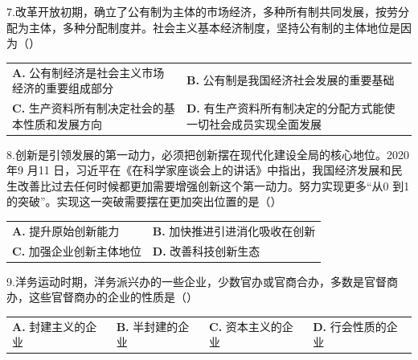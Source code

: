 \documentclass[UTF8,11pt]{ctexart}
\begin{document}
7.改革开放初期，确立了公有制为主体的市场经济，多种所有制共同发展，按劳分配为主体，多种分配制度并。社会主义基本经济制度，坚持公有制的主体地位是因为（）


\begin{center}\begin{tabular}{>{\raggedright\arraybackslash}p{\dimexpr(\linewidth-4\tabcolsep)/2\relax}>{\raggedright\arraybackslash}p{\dimexpr(\linewidth-4\tabcolsep)/2\relax}}
\textbf{A.} 公有制经济是社会主义市场经济的重要组成部分 & \textbf{B.} 公有制是我国经济社会发展的重要基础\\[.35em]
\textbf{C.} 生产资料所有制决定社会的基本性质和发展方向 & \textbf{D.} 有生产资料所有制决定的分配方式能使一切社会成员实现全面发展\\[.35em]\end{tabular}\end{center}

8.创新是引领发展的第一动力，必须把创新摆在现代化建设全局的核心地位。2020 年9 月11 日，习近平在《在科学家座谈会上的讲话》中指出，我国经济发展和民生改善比过去任何时候都更加需要增强创新这个第一动力。努力实现更多“从0 到1 的突破”。实现这一突破需要摆在更加突出位置的是（）


\begin{center}\begin{tabular}{>{\raggedright\arraybackslash}p{\dimexpr(\linewidth-4\tabcolsep)/2\relax}>{\raggedright\arraybackslash}p{\dimexpr(\linewidth-4\tabcolsep)/2\relax}}
\textbf{A.} 提升原始创新能力 & \textbf{B.} 加快推进引进消化吸收在创新\\[.35em]
\textbf{C.} 加强企业创新主体地位 & \textbf{D.} 改善科技创新生态\\[.35em]\end{tabular}\end{center}

9.洋务运动时期，洋务派兴办的一些企业，少数官办或官商合办，多数是官督商办，这些官督商办的企业的性质是（）


\begin{center}\begin{tabular}{>{\raggedright\arraybackslash}p{\dimexpr(\linewidth-8\tabcolsep)/4\relax}>{\raggedright\arraybackslash}p{\dimexpr(\linewidth-8\tabcolsep)/4\relax}>{\raggedright\arraybackslash}p{\dimexpr(\linewidth-8\tabcolsep)/4\relax}>{\raggedright\arraybackslash}p{\dimexpr(\linewidth-8\tabcolsep)/4\relax}}
\textbf{A.} 封建主义的企业 & \textbf{B.} 半封建的企业 & \textbf{C.} 资本主义的企业 & \textbf{D.} 行会性质的企业\\[.35em]\end{tabular}\end{center}
\end{document}
